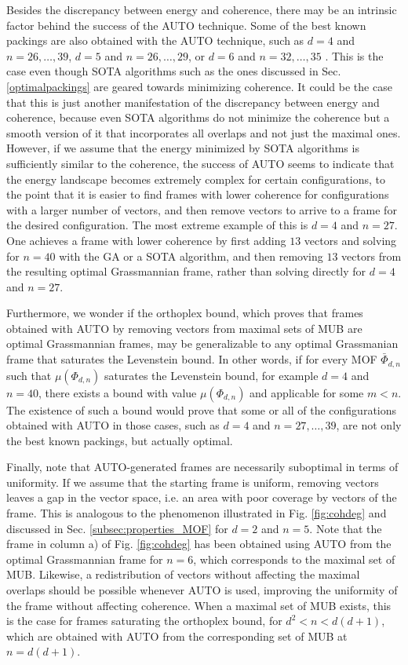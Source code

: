 \documentclass[%
superscriptaddress,
amsmath,amssymb,
 aps,
pra,
floatfix,
]{revtex4-2}
\begin{document}
Besides the discrepancy between energy and coherence, there may be an intrinsic factor behind the success of the AUTO technique. Some of the best known packings are also obtained with the AUTO technique, such as $d=4$ and $n=26, \ldots, 39$, $d=5$ and $n=26, \ldots, 29$, or $d=6$ and $n=32, \ldots, 35$ \cite{gameofsloanes}. This is the case even though SOTA algorithms such as the ones discussed in Sec. \ref{optimalpackings} are geared towards minimizing coherence. It could be the case that this is just another manifestation of the discrepancy between energy and coherence, because even SOTA algorithms do not minimize the coherence but a smooth version of it that incorporates all overlaps and not just the maximal ones. However, if we assume that the energy minimized by SOTA algorithms is sufficiently similar to the coherence, the success of AUTO seems to indicate that the energy landscape becomes extremely complex for certain configurations, to the point that it is easier to find frames with lower coherence for configurations with a larger number of vectors, and then remove vectors to arrive to a frame for the desired configuration. The most extreme example of this is $d=4$ and $n=27$. One achieves a frame with lower coherence by first adding $13$ vectors and solving for $n=40$ with the GA or a SOTA algorithm, and then removing $13$ vectors from the resulting optimal Grassmannian frame, rather than solving directly for $d=4$ and $n=27$.

Furthermore, we wonder if the orthoplex bound, which proves that frames obtained with AUTO by removing vectors from maximal sets of MUB are optimal Grassmannian frames, may be generalizable to any optimal Grassmanian frame that saturates the Levenstein bound. In other words, if for every MOF $\bar \Phi_{d, n}$ such that $\mu(\Phi_{d, n})$ saturates the Levenstein bound, for example $d=4$ and $n=40$, there exists a bound with value $\mu(\Phi_{d, n})$ and applicable for some $m < n$.  The existence of such a bound would prove that some or all of the configurations obtained with AUTO in those cases, such as $d=4$ and $n=27, \ldots, 39$, are not only the best known packings, but actually optimal.

Finally, note that AUTO-generated frames are necessarily suboptimal in terms of uniformity. If we assume that the starting frame is uniform, removing vectors leaves a gap in the vector space, i.e. an area with poor coverage by vectors of the frame. This is analogous to the phenomenon illustrated in Fig. \ref{fig:cohdeg} and discussed in Sec. \ref{subsec:properties_MOF} for $d=2$ and $n=5$. Note that the frame in column a) of Fig. \ref{fig:cohdeg} has been obtained using AUTO from the optimal Grassmannian frame for $n=6$, which corresponds to the maximal set of MUB. Likewise, a redistribution of vectors without affecting the maximal overlaps should be possible whenever AUTO is used, improving the uniformity of the frame without affecting coherence. When a maximal set of MUB exists, this is the case for frames saturating the orthoplex bound, for $d^2 < n < d(d+1)$, which are obtained with AUTO from the corresponding set of MUB at $n=d(d+1)$. 
\end{document}
